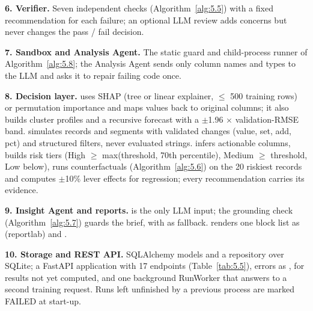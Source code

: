\textbf{6. Verifier.} Seven independent checks (Algorithm~\ref{alg:5.5}) with a fixed recommendation for each failure; an optional LLM review adds concerns but never changes the pass / fail decision.

\textbf{7. Sandbox and Analysis Agent.} The static guard and child-process runner of Algorithm~\ref{alg:5.8}; the Analysis Agent sends only column names and types to the LLM and asks it to repair failing code once.

\textbf{8. Decision layer.}  uses SHAP (tree or linear explainer, \ensuremath{\leq} 500 training rows) or permutation importance and maps values back to original columns; it also builds cluster profiles and a recursive forecast with a \ensuremath{\pm}1.96 \ensuremath{\times} validation-RMSE band.  simulates records and segments with validated changes (value, set, add, pct) and structured filters, never evaluated strings.  infers actionable columns, builds risk tiers (High \ensuremath{\geq} max(threshold, 70th percentile), Medium \ensuremath{\geq} threshold, Low below), runs counterfactuals (Algorithm~\ref{alg:5.6}) on the 20 riskiest records and computes \ensuremath{\pm}10\% lever effects for regression; every recommendation carries its evidence.

\textbf{9. Insight Agent and reports.}  is the only LLM input; the grounding check (Algorithm~\ref{alg:5.7}) guards the brief, with  as fallback.  renders one block list as  (reportlab) and .

\textbf{10. Storage and REST API.} SQLAlchemy models and a repository over SQLite; a FastAPI application with 17 endpoints (Table~\ref{tab:5.5}), errors as ,  for results not yet computed, and one background RunWorker that answers  to a second training request. Runs left unfinished by a previous process are marked FAILED at start-up.

